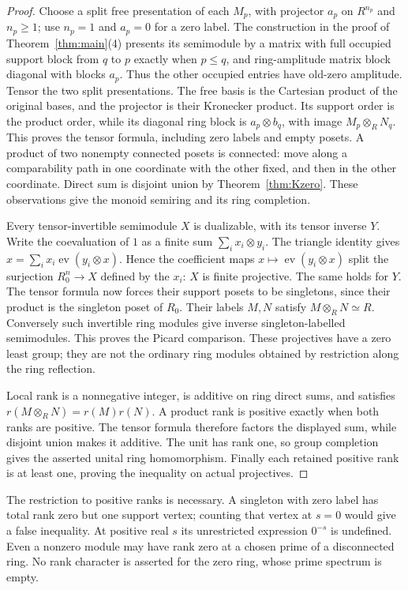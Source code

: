 \begin{proof}
Choose a split free presentation of each $M_p$, with projector $a_p$
on $R^{n_p}$ and $n_p\ge1$; use $n_p=1$ and $a_p=0$ for a zero label.
The construction in the proof of Theorem~\ref{thm:main}(4) presents its
semimodule by a matrix with full occupied support block from $q$ to $p$
exactly when $p\le q$, and ring-amplitude matrix block diagonal with
blocks $a_p$. Thus the other occupied entries have old-zero amplitude.
Tensor the two split presentations. The free basis is the Cartesian
product of the original bases, and the projector is their Kronecker
product. Its support order is the product order, while its diagonal
ring block is $a_p\otimes b_q$, with image $M_p\otimes_R N_q$.
This proves the tensor formula, including zero labels and empty posets.
A product of two nonempty connected posets is connected: move along a
comparability path in one coordinate with the other fixed, and then in
the other coordinate. Direct sum is disjoint union by
Theorem~\ref{thm:Kzero}. These observations give the monoid semiring
and its ring completion.

Every tensor-invertible semimodule $X$ is dualizable, with its tensor
inverse $Y$. Write the coevaluation of $1$ as a finite sum
$\sum_i x_i\otimes y_i$. The triangle identity gives
$x=\sum_i x_i\operatorname{ev}(y_i\otimes x)$. Hence the coefficient
maps $x\mapsto\operatorname{ev}(y_i\otimes x)$ split the surjection
$R_0^n\to X$ defined by the $x_i$: $X$ is finite projective.
The same holds for $Y$. The tensor formula now forces their support
posets to be singletons, since their product is the singleton poset
of $R_0$. Their labels $M,N$ satisfy $M\otimes_R N\simeq R$.
Conversely such invertible ring modules give inverse singleton-labelled
semimodules. This proves the Picard comparison. These projectives have
a zero least group; they are not the ordinary ring modules obtained
by restriction along the ring reflection.

Local rank is a nonnegative integer, is additive on ring direct sums,
and satisfies $r(M\otimes_R N)=r(M)r(N)$. A product rank is positive
exactly when both ranks are positive. The tensor formula therefore
factors the displayed sum, while disjoint union makes it additive.
The unit has rank one, so group completion gives the asserted unital
ring homomorphism. Finally each retained positive rank is at least one,
proving the inequality on actual projectives.
\end{proof}
The restriction to positive ranks is necessary. A singleton with zero
label has total rank zero but one support vertex; counting that vertex
at $s=0$ would give a false inequality. At positive real $s$ its
unrestricted expression $0^{-s}$ is undefined. Even a nonzero module
may have rank zero at a chosen prime of a disconnected ring. No rank
character is asserted for the zero ring, whose prime spectrum is empty.
